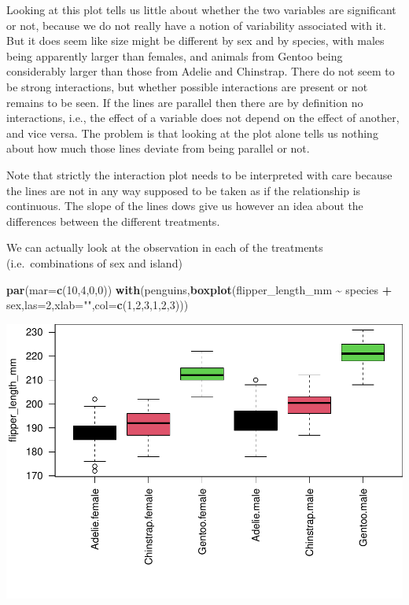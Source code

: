 \documentclass[
]{book}
\newenvironment{Shaded}{\begin{snugshade}}{\end{snugshade}}
\newcommand{\AttributeTok}[1]{\textcolor[rgb]{0.13,0.29,0.53}{#1}}
\newcommand{\DecValTok}[1]{\textcolor[rgb]{0.00,0.00,0.81}{#1}}
\newcommand{\FunctionTok}[1]{\textcolor[rgb]{0.13,0.29,0.53}{\textbf{#1}}}
\newcommand{\NormalTok}[1]{#1}
\newcommand{\SpecialCharTok}[1]{\textcolor[rgb]{0.81,0.36,0.00}{\textbf{#1}}}
\newcommand{\StringTok}[1]{\textcolor[rgb]{0.31,0.60,0.02}{#1}}
\begin{document}
Looking at this plot tells us little about whether the two variables are significant or not, because we do not really have a notion of variability associated with it. But it does seem like size might be different by sex and by species, with males being apparently larger than females, and animals from Gentoo being considerably larger than those from Adelie and Chinstrap. There do not seem to be strong interactions, but whether possible interactions are present or not remains to be seen. If the lines are parallel then there are by definition no interactions, i.e., the effect of a variable does not depend on the effect of another, and vice versa. The problem is that looking at the plot alone tells us nothing about how much those lines deviate from being parallel or not.

Note that strictly the interaction plot needs to be interpreted with care because the lines are not in any way supposed to be taken as if the relationship is continuous. The slope of the lines dows give us however an idea about the differences between the different treatments.

We can actually look at the observation in each of the treatments (i.e.~combinations of sex and island)

\begin{Shaded}
\begin{Highlighting}[]
\FunctionTok{par}\NormalTok{(}\AttributeTok{mar=}\FunctionTok{c}\NormalTok{(}\DecValTok{10}\NormalTok{,}\DecValTok{4}\NormalTok{,}\DecValTok{0}\NormalTok{,}\DecValTok{0}\NormalTok{))}
\FunctionTok{with}\NormalTok{(penguins,}\FunctionTok{boxplot}\NormalTok{(flipper\_length\_mm }\SpecialCharTok{\textasciitilde{}}\NormalTok{ species }\SpecialCharTok{+}\NormalTok{ sex,}\AttributeTok{las=}\DecValTok{2}\NormalTok{,}\AttributeTok{xlab=}\StringTok{""}\NormalTok{,}\AttributeTok{col=}\FunctionTok{c}\NormalTok{(}\DecValTok{1}\NormalTok{,}\DecValTok{2}\NormalTok{,}\DecValTok{3}\NormalTok{,}\DecValTok{1}\NormalTok{,}\DecValTok{2}\NormalTok{,}\DecValTok{3}\NormalTok{)))}
\end{Highlighting}
\end{Shaded}

\includegraphics{ECOMODbook_files/figure-latex/a8.40-1.pdf}
\end{document}

